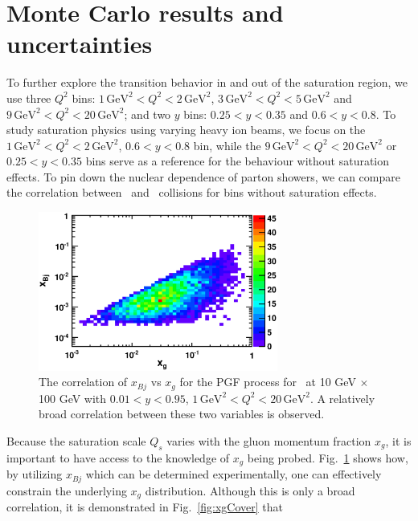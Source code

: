 \section{Monte Carlo results and uncertainties} 
 To further explore the
transition behavior in and out of the saturation region, we use three $Q^{2}$ bins:
$1\, \textrm{GeV}^{2}<Q^{2}<2 \, \mathrm{GeV}^{2}$, $3\, \textrm{GeV}^{2}<Q^{2}<5 \,
\mathrm{GeV}^{2}$ and $9\, \textrm{GeV}^{2}<Q^{2}<20 \, \mathrm{GeV}^{2}$; and two $y$ bins:
$0.25<y<0.35$ and $0.6<y<0.8$. To study saturation physics using varying heavy
ion beams, we focus on the $1\, \textrm{GeV}^{2}<Q^{2}<2 \, \mathrm{GeV}^{2}$, $0.6<y<0.8$
bin, while the $9\, \textrm{GeV}^{2}<Q^{2}<20 \, \mathrm{GeV}^{2}$ or $0.25<y<0.35$ bins serve
as a reference for the behaviour without saturation effects. To pin down the
nuclear dependence of parton showers, we can compare the correlation between \ep\
and \eA\ collisions for bins without saturation effects.
\begin{figure}
\begin{center}
\includegraphics[width=0.7\textwidth]{plots/chpt6/xbjVsxg_highPtPairs_PGF_10x100.eps}
\end{center}
\caption[Correlation of $x_g$ and $x_{Bj}$]{The correlation of $x_{Bj}$ vs $x_{g}$ for the PGF process for \ep\ at 
10 GeV $\times$ 100 GeV with $0.01<y<0.95$, $1\, \textrm{GeV}^{2}<Q^{2}<20 \, \mathrm{GeV^{2}}$. A relatively 
broad correlation between these two variables is observed. }
\label{fig:xbjVsxg}
\end{figure}
Because the saturation scale $Q_{s}$ varies with the gluon momentum fraction
$x_{g}$, it is important to have access to the knowledge of $x_{g}$ being probed.
Fig.~\ref{fig:xbjVsxg} shows how, by utilizing $x_{Bj}$ which can be determined experimentally, one can
effectively constrain the underlying $x_{g}$ distribution. Although this is only
a broad correlation, it is demonstrated in Fig.~\ref{fig:xgCover} that
